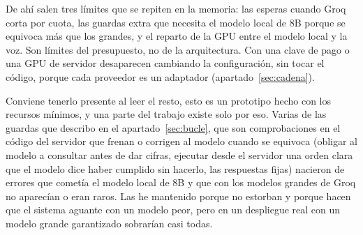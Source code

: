 De ahí salen tres límites que se repiten en la memoria: las esperas cuando Groq corta por cuota, las guardas extra que
necesita el modelo local de 8B porque se equivoca más que los grandes, y el reparto de la GPU entre el modelo local y
la voz. Son límites del presupuesto, no de la arquitectura. Con una clave de pago o una GPU de servidor desaparecen
cambiando la configuración, sin tocar el código, porque cada proveedor es un adaptador (apartado~\ref{sec:cadena}).

Conviene tenerlo presente al leer el resto, esto es un prototipo hecho con los recursos mínimos, y una parte del
trabajo existe solo por eso. Varias de las guardas que describo en el apartado~\ref{sec:bucle}, que son comprobaciones
en el código del servidor que frenan o corrigen al modelo cuando se equivoca (obligar al modelo a
consultar antes de dar cifras, ejecutar desde el servidor una orden clara que el modelo dice haber cumplido sin
hacerlo, las respuestas fijas) nacieron de errores que cometía el modelo local de 8B y que con los modelos grandes de
Groq no aparecían o eran raros. Las he mantenido porque no estorban y porque hacen que el sistema aguante con un
modelo peor, pero en un despliegue real con un modelo grande garantizado sobrarían casi todas.
